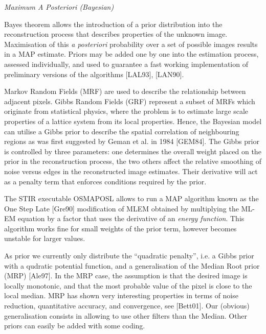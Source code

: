 \documentclass{article}
\begin{document}
\begin{spacing}{1.5}
\textit{Maximum A Posteriori (Bayesian)}


\end{spacing}

Bayes theorem allows the introduction of a prior distribution 
into the reconstruction process that describes properties of 
the unknown image. Maximisation of this \textit{a posteriori} probability 
over a set of possible images results in a MAP estimate. Priors 
may be added one by one into the estimation process, assessed 
individually, and used to guarantee a fast working implementation 
of preliminary versions of the algorithms [LAL93], [LAN90].

Markov Random Fields (MRF) are used to describe the relationship 
between adjacent pixels. Gibbs Random Fields (GRF) represent 
a subset of MRFs which originate from statistical physics, where 
the problem is to estimate large scale properties of a lattice 
system from its local properties. Hence, the Bayesian model can 
utilise a Gibbs prior to describe the spatial correlation of 
neighbouring regions as was first suggested by Geman et al. in 
1984 [GEM84]. The Gibbs prior is controlled by three parameters: 
one determines the overall weight placed on the prior in the 
reconstruction process, the two others affect the relative smoothing 
of noise versus edges in the reconstructed image estimates. Their 
derivative will act as a penalty term that enforces conditions 
required by the prior.

The STIR executable OSMAPOSL allows to run a MAP algorithm 
known as the One Step Late [Gre90] modification of MLEM obtained 
by multiplying the ML-EM equation by a factor that uses the derivative 
of an \textit{energy function}. This algorithm works fine 
for small weights of the prior term, however becomes unstable 
for larger values. 

As prior we currently only distribute the ``quadratic penalty'', i.e. a
Gibbs prior with a qudratic potential function, and a generalisation of the 
Median Root prior (MRP) [Ale97]. In the MRP case, the assumption 
is that the desired image is locally monotonic, and that the 
most probable value of the pixel is close to the local median. 
MRP has shown very interesting properties in terms of noise reduction, 
quantitative accuracy, and convergence, see [Bett01]. Our (obvious) 
generalisation consists in allowing to use other filters than 
the Median. Other priors can easily be added with some coding. 
\end{document}
